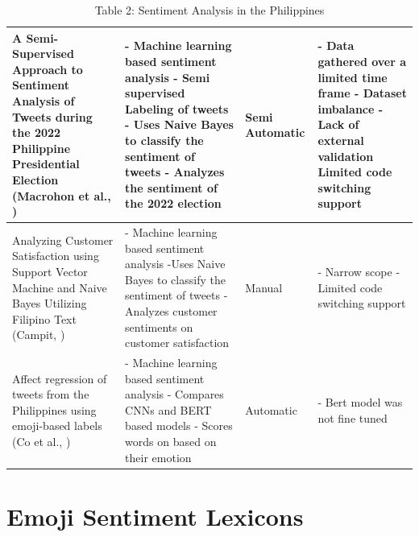 \newpage

\begin{table}
	\centering
	\begin{tabular}{|m{10em} | m{7em} | m{5em} | m{7em} |}
		\hline
		A Semi-Supervised Approach to Sentiment Analysis of Tweets during the 2022 Philippine Presidential Election (Macrohon et al., \citeyear{Macrohon2022}) &
		- Machine learning based sentiment analysis
		\newline - Semi supervised Labeling of tweets
		\newline - Uses Naive Bayes to classify the sentiment of tweets
		\newline - Analyzes the sentiment of the 2022 election &
		Semi Automatic &
		- Data gathered over a limited time frame
		\newline - Dataset imbalance
		\newline - Lack of external validation
		\newline Limited code switching support \\
		\hline
		Analyzing Customer Satisfaction using Support Vector Machine and Naive Bayes Utilizing Filipino Text (Campit, \citeyear{Campit2023}) &
		- Machine learning based sentiment analysis
		\newline -Uses Naive Bayes to classify the sentiment of tweets
		\newline -Analyzes customer sentiments on customer satisfaction &
		Manual &
		- Narrow scope
		\newline - Limited code switching support\\
		\hline
		Affect regression of tweets from the Philippines using emoji-based labels (Co et al., \citeyear{Co2023}) &
		- Machine learning based sentiment analysis
		\newline - Compares CNNs and BERT based models
		\newline - Scores words on based on their emotion &
		Automatic &
		- Bert model was not fine tuned\\
		\hline
	\end{tabular}
	\caption{Table 2: Sentiment Analysis in the Philippines}
\end{table}

\section{Emoji Sentiment Lexicons}

